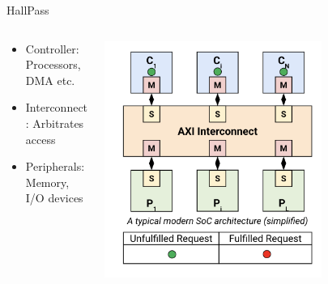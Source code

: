 \begin{frame}{HallPass}
    \begin{columns}
        \begin{column}{0.5\textwidth}
            \begin{itemize}
                \item Controller: Processors, DMA etc.
                \item Interconnect: Arbitrates access
                \item Peripherals: Memory, I/O devices
            \end{itemize} 
        \end{column}
        \begin{column}{0.5\textwidth}
                \centering
                \includegraphics[height=0.7\textheight,width=0.7\textwidth,keepaspectratio]{SoC.png}
        \end{column}
    \end{columns}
\end{frame}

